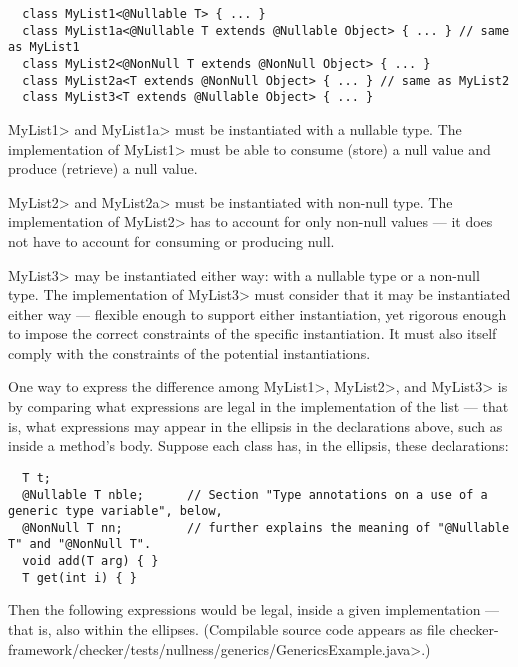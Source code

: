 \begin{Verbatim}
  class MyList1<@Nullable T> { ... }
  class MyList1a<@Nullable T extends @Nullable Object> { ... } // same as MyList1
  class MyList2<@NonNull T extends @NonNull Object> { ... }
  class MyList2a<T extends @NonNull Object> { ... } // same as MyList2
  class MyList3<T extends @Nullable Object> { ... }
\end{Verbatim}

\<MyList1> and \<MyList1a> must be instantiated with a nullable type.
The implementation of \<MyList1> must be able to consume (store) a null
value and produce (retrieve) a null value.

\<MyList2> and \<MyList2a> must be instantiated with non-null type.
The implementation of \<MyList2> has to account for only non-null values --- it
does not have to account for consuming or producing null.

\<MyList3> may be instantiated either way:
with a nullable type or a non-null type.  The implementation of \<MyList3> must consider
that it may be instantiated either way --- flexible enough to support either
instantiation, yet rigorous enough to impose the correct constraints of the
specific instantiation.  It must also itself comply with the constraints of
the potential instantiations.

One way to express the difference among \<MyList1>, \<MyList2>, and
\<MyList3> is by comparing what expressions are legal in the implementation
of the list --- that is, what expressions may appear in the ellipsis in the
declarations above, such as inside a method's body.  Suppose each class
has, in the ellipsis, these declarations:

\begin{Verbatim}
  T t;
  @Nullable T nble;      // Section "Type annotations on a use of a generic type variable", below,
  @NonNull T nn;         // further explains the meaning of "@Nullable T" and "@NonNull T".
  void add(T arg) { }
  T get(int i) { }
\end{Verbatim}

\noindent
Then the following expressions would be legal, inside a given
implementation --- that is, also within the ellipses.
(Compilable source code appears as file
\<checker-framework/checker/tests/nullness/generics/GenericsExample.java>.)

